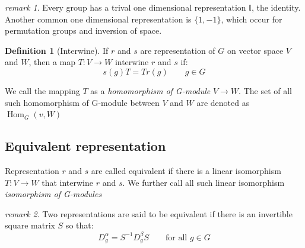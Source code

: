 \documentclass{amsart}
\theoremstyle{remark}
\newtheorem*{remark}{remark}
\theoremstyle{remark}
\theoremstyle{definition}
\newtheorem*{definition}{Definition}
\DeclareMathOperator{\Hom}{Hom}
\begin{document}
\begin{remark}
Every group has a trival one dimensional representation $\mathbb{I}$, the identity. 
Another common one dimensional representation is $\{1, -1\}$, which occur for permutation 
groups and inversion of space.
\end{remark}

\begin{definition}
    [Interwine]
    If $r$ and $s$ are representation of $G$ on vector space $V$ and $W$, then a map
    $T\colon V\to W$ interwine $r$ and $s$ if:
    \[s(g)T = Tr(g) \qquad g\in G\]
\end{definition}
We call the mapping $T$ as a \emph{homomorphism of G-module} $V\to W$. The set of all such homomorphism of G-module 
between $V$ and $W$ are denoted as $\Hom_G(v,W)$

\vspace{10pt}

\subsection*{Equivalent representation}
Representation $r$ and $s$ are called equivalent if there is a linear isomorphism $T\colon V\to W$ that 
interwine $r$ and $s$. We further call all such linear isomorphism \emph{isomorphism of G-modules} 

\begin{remark}
    Two representations are said to be equivalent if there is an invertible square matrix $S$
    so that:
    \begin{equation*}
        D^{\alpha}_g = S^{-1} D^{\beta}_g S \qquad \text{for all $g\in G$}
    \end{equation*}
\end{remark}
\end{document}
